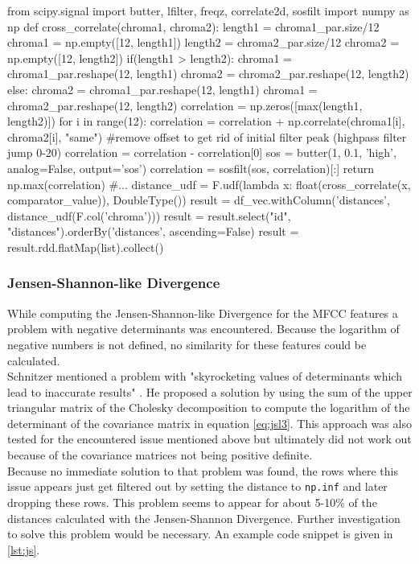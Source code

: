 \begin{pythonCode}[frame=single,label={lst:corrnp},caption={cross-correlation numpy},captionpos=b]
from scipy.signal import butter, lfilter, freqz, correlate2d, sosfilt
import numpy as np
def cross_correlate(chroma1, chroma2):
    length1 = chroma1_par.size/12
    chroma1 = np.empty([12, length1])
    length2 = chroma2_par.size/12
    chroma2 = np.empty([12, length2])
    if(length1 > length2):
        chroma1 = chroma1_par.reshape(12, length1)
        chroma2 = chroma2_par.reshape(12, length2)
    else:
        chroma2 = chroma1_par.reshape(12, length1)
        chroma1 = chroma2_par.reshape(12, length2)      
    correlation = np.zeros([max(length1, length2)])
    for i in range(12):
        correlation = correlation + np.correlate(chroma1[i], chroma2[i], "same")    
    #remove offset to get rid of initial filter peak (highpass filter jump 0-20)
    correlation = correlation - correlation[0]
    sos = butter(1, 0.1, 'high', analog=False, output='sos')
    correlation = sosfilt(sos, correlation)[:]
    return np.max(correlation)
#...
distance_udf = F.udf(lambda x: float(cross_correlate(x, comparator_value)), DoubleType())
result = df_vec.withColumn('distances', distance_udf(F.col('chroma')))
result = result.select("id", "distances").orderBy('distances', ascending=False)
result = result.rdd.flatMap(list).collect()
\end{pythonCode}

\subsubsection{Jensen-Shannon-like Divergence}

While computing the Jensen-Shannon-like Divergence for the MFCC features a problem with negative determinants was encountered. Because the logarithm of negative numbers is not defined, no similarity for these features could be calculated.\\ 
Schnitzer mentioned a problem with "skyrocketing values of determinants which lead to inaccurate results" \cite[p.45]{schnitzer1}. He proposed a solution by using the sum of the upper triangular matrix of the Cholesky decomposition to compute the logarithm of the determinant of the covariance matrix in equation \ref{eq:jsl3}. 
This approach was also tested for the encountered issue mentioned above but ultimately did not work out because of the covariance matrices not being positive definite.\\
Because no immediate solution to that problem was found, the rows where this issue appears just get filtered out by setting the distance to \lstinline{np.inf} and later dropping these rows. This problem seems to appear for about 5-10\% of the distances calculated with the Jensen-Shannon Divergence. Further investigation to solve this problem would be necessary. 
An example code snippet is given in \ref{lst:js}.

